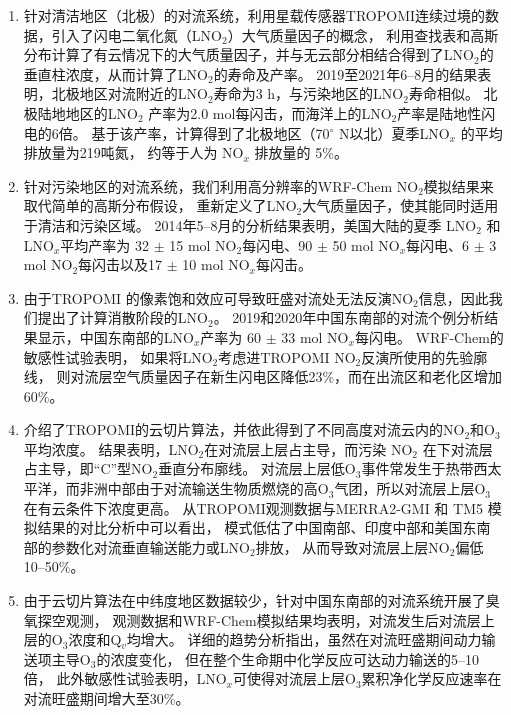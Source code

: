 \begin{enumerate}[label=（\arabic*）, labelindent=\parindent, leftmargin=0pt, widest=0, itemindent=*, topsep=0pt, partopsep=0pt, parsep=0pt]

\item 针对清洁地区（北极）的对流系统，利用星载传感器TROPOMI连续过境的数据，引入了闪电二氧化氮（LNO$_2$）大气质量因子的概念，
利用查找表和高斯分布计算了有云情况下的大气质量因子，并与无云部分相结合得到了LNO$_2$的垂直柱浓度，从而计算了LNO$_2$的寿命及产率。
2019至2021年6--8月的结果表明，北极地区对流附近的LNO$_2$寿命为3 h，与污染地区的LNO$_2$寿命相似。
北极陆地地区的LNO$_2$ 产率为2.0 mol每闪击，而海洋上的LNO$_2$产率是陆地性闪电的6倍。
基于该产率，计算得到了北极地区（70$^{\circ}$ N以北）夏季LNO$_x$ 的平均排放量为219吨氮，
约等于人为 NO$_x$ 排放量的 5\%。

\item 针对污染地区的对流系统，我们利用高分辨率的WRF-Chem NO$_2$模拟结果来取代简单的高斯分布假设，
重新定义了LNO$_2$大气质量因子，使其能同时适用于清洁和污染区域。
2014年5--8月的分析结果表明，美国大陆的夏季 LNO$_2$ 和 LNO$_x$平均产率为
32 $\pm$ 15 mol NO$_2$每闪电、90 $\pm$ 50 mol NO$_x$每闪电、6 $\pm$ 3 mol NO$_2$每闪击以及17 $\pm$ 10 mol NO$_x$每闪击。

\item 由于TROPOMI 的像素饱和效应可导致旺盛对流处无法反演NO$_2$信息，因此我们提出了计算消散阶段的LNO$_2$。
2019和2020年中国东南部的对流个例分析结果显示，中国东南部的LNO$_x$产率为 60 $\pm$ 33 mol NO$_x$每闪电。
WRF-Chem的敏感性试验表明，
如果将LNO$_2$考虑进TROPOMI NO$_2$反演所使用的先验廓线，
则对流层空气质量因子在新生闪电区降低23\%，而在出流区和老化区增加60\%。

\item 介绍了TROPOMI的云切片算法，并依此得到了不同高度对流云内的NO$_2$和O$_3$平均浓度。
结果表明，LNO$_2$在对流层上层占主导，而污染 NO$_2$ 在下对流层占主导，即“C”型NO$_2$垂直分布廓线。
对流层上层低O$_3$事件常发生于热带西太平洋，而非洲中部由于对流输送生物质燃烧的高O$_3$气团，所以对流层上层O$_3$在有云条件下浓度更高。
从TROPOMI观测数据与MERRA2-GMI 和 TM5 模拟结果的对比分析中可以看出，
模式低估了中国南部、印度中部和美国东南部的参数化对流垂直输送能力或LNO$_2$排放，
从而导致对流层上层NO$_2$偏低10--50\%。

\item 由于云切片算法在中纬度地区数据较少，针对中国东南部的对流系统开展了臭氧探空观测，
观测数据和WRF-Chem模拟结果均表明，对流发生后对流层上层的O$_3$浓度和Q$_v$均增大。
详细的趋势分析指出，虽然在对流旺盛期间动力输送项主导O$_3$的浓度变化，
但在整个生命期中化学反应可达动力输送的5--10倍，
此外敏感性试验表明，LNO$_x$可使得对流层上层O$_3$累积净化学反应速率在对流旺盛期间增大至30\%。

\end{enumerate}

